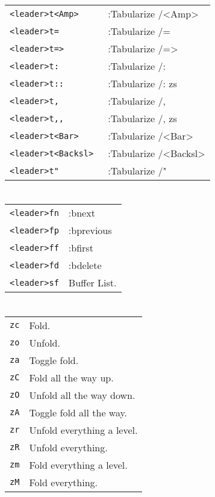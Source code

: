 \begin{multicols}{3}
	\section{}
	\begin{tabular}{@{}ll@{}}
		\verb!<leader>t<Amp> !    & :Tabularize  /<Amp>    \\
		\verb!<leader>t= !        & :Tabularize  /=        \\
		\verb!<leader>t=>!        & :Tabularize  /=>       \\
		\verb!<leader>t: !        & :Tabularize  /:        \\
		\verb!<leader>t::!        & :Tabularize  /: zs     \\
		\verb!<leader>t, !        & :Tabularize  /,        \\
		\verb!<leader>t,,!        & :Tabularize  /, zs     \\
		\verb!<leader>t<Bar>!     & :Tabularize  /<Bar>    \\
		\verb!<leader>t<Backsl> ! & :Tabularize  /<Backsl> \\
		\verb!<leader>t" !        & :Tabularize  /"        \\
	\end{tabular}

	\section{}
	\begin{tabular}{@{}ll@{}}
		\verb!<leader>fn! & :bnext       \\
		\verb!<leader>fp! & :bprevious   \\
		\verb!<leader>ff! & :bfirst      \\
		\verb!<leader>fd! & :bdelete     \\
		\verb!<leader>sf! & Buffer List. \\
	\end{tabular}

	\section{}
	\begin{tabular}{@{}ll@{}}
		\verb!zc! & Fold.                      \\
		\verb!zo! & Unfold.                    \\
		\verb!za! & Toggle fold.               \\
		\verb!zC! & Fold all the way up.       \\
		\verb!zO! & Unfold all the way down.   \\
		\verb!zA! & Toggle fold all the way.   \\
		\verb!zr! & Unfold everything a level. \\
		\verb!zR! & Unfold everything.         \\
		\verb!zm! & Fold everything a level.   \\
		\verb!zM! & Fold everything.           \\
	\end{tabular}


\end{multicols}
